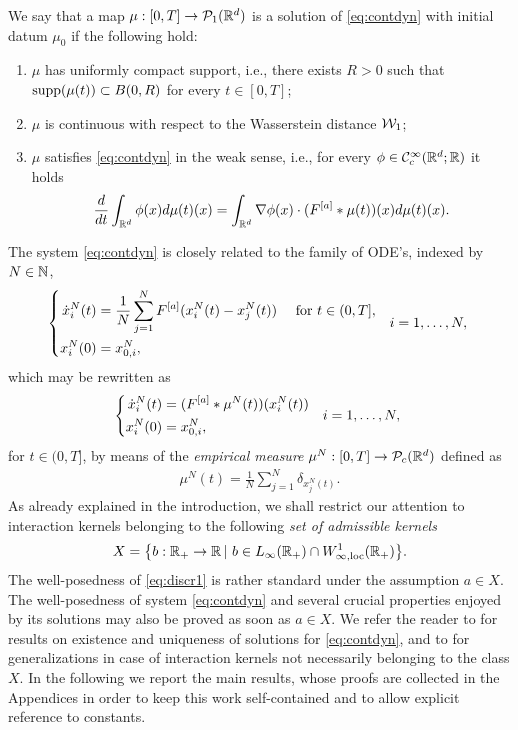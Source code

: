 \begin{definition}
We say that a map $\mu:[0,T]\rightarrow\mathcal{P}_1(\mathbb{R}^d)$ is a solution of \eqref{eq:contdyn} with initial datum $\mu_0$ if the following hold:
\begin{enumerate}
\item $\mu$ has uniformly compact support, i.e., there exists $R > 0$ such that $\operatorname{supp}(\mu(t)) \subset B(0,R)$ for every $t \in [0,T]$;
\item $\mu$ is continuous with respect to the Wasserstein distance $\mathcal{W}_1$;
\item $\mu$ satisfies \eqref{eq:contdyn} in the weak sense, i.e., for every $\phi \in \mathcal{C}^{\infty}_c(\mathbb{R}^d;\mathbb{R})$ it holds
\begin{align*}
\frac{d}{dt} \int_{\mathbb{R}^d} \phi(x) d\mu(t)(x) = \int_{\mathbb{R}^d} \nabla \phi(x) \cdot (F^{[a]}*\mu(t))(x) d\mu(t)(x).
\end{align*}
\end{enumerate}
\end{definition}

The system \eqref{eq:contdyn} is closely related to the family of ODE's, indexed by $N \in \mathbb{N}$,
\begin{align}\label{eq:discrdyn}
\left\{\begin{aligned}
\dot{x}^N_i(t) &= \frac{1}{N}\sum^N_{j = 1}F^{[a]}(x^N_i(t) - x^N_j(t)) \quad \text{ for } t \in (0,T],\\
x_i^N(0) &= x^N_{0,i},
\end{aligned} \quad i = 1, \ldots, N, \right.
\end{align}
which may be rewritten as 
\begin{align}\label{eq:discr1}
\left\{\begin{aligned}
\dot{x}^N_i(t) &= (F^{[a]}*\mu^N(t))(x^N_i(t)) \\
x^N_i(0) &= x^N_{0,i},
\end{aligned} \quad i = 1, \ldots, N, \right.
\end{align}
for $t\in(0,T]$, by means of the \textit{empirical measure} $\mu^N:[0,T]\rightarrow\mathcal{P}_c(\mathbb{R}^d)$ defined as
\begin{align}\label{eq:empmeas}
\mu^N(t) = \frac{1}{N}\sum^N_{j = 1} \delta_ {x^N_j(t)}.
\end{align}
As already explained in the introduction, we shall restrict our attention to interaction kernels belonging to the following \textit{set of admissible kernels}
\begin{align*}
	X=\bigl\{b:\mathbb{R}_+\rightarrow\mathbb{R}\,|\ b \in L_{\infty}(\mathbb{R}_+) \cap W^{1}_{\infty,\textup{loc}}(\mathbb{R}_+) \bigr \}.
\end{align*}
The well-posedness of \eqref{eq:discr1} is rather standard under the assumption $a \in X$. The well-posedness of system \eqref{eq:contdyn} and several crucial properties enjoyed by its solutions may also be proved as soon as $a \in X$.
We refer the reader to \cite{AGS} for results on existence and uniqueness of solutions for \eqref{eq:contdyn}, and to  \cite{13-Carrillo-Choi-Hauray-MFL} for generalizations in case of interaction kernels not necessarily belonging to the class $X$. In the following we report the main results, whose proofs are collected in the Appendices in order to keep this work self-contained and to allow explicit reference to constants.
 

